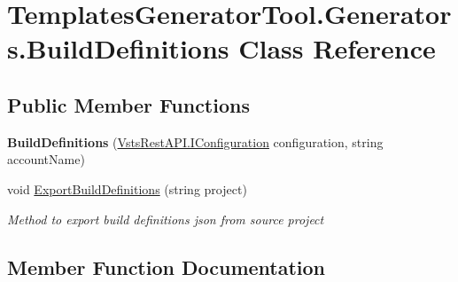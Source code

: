 \hypertarget{class_templates_generator_tool_1_1_generators_1_1_build_definitions}{}\section{Templates\+Generator\+Tool.\+Generators.\+Build\+Definitions Class Reference}
\label{class_templates_generator_tool_1_1_generators_1_1_build_definitions}
\subsection*{Public Member Functions}
\begin{DoxyCompactItemize}
\item 
\mbox{\label{class_templates_generator_tool_1_1_generators_1_1_build_definitions_ad677e6263ff3adc7b7df52ab8b023a3e}} 
{\bfseries Build\+Definitions} (\mbox{\hyperlink{interface_vsts_rest_a_p_i_1_1_i_configuration}{Vsts\+Rest\+A\+P\+I.\+I\+Configuration}} configuration, string account\+Name)
\item 
void \mbox{\hyperlink{class_templates_generator_tool_1_1_generators_1_1_build_definitions_a15b3c815112e04b0748ed7f1f12fa2cb}{Export\+Build\+Definitions}} (string project)
\begin{DoxyCompactList}\small\item\em Method to export build definitions json from source project \end{DoxyCompactList}\end{DoxyCompactItemize}


\subsection{Member Function Documentation}
\mbox{\label{class_templates_generator_tool_1_1_generators_1_1_build_definitions_a15b3c815112e04b0748ed7f1f12fa2cb}} 
